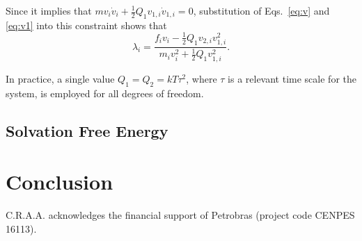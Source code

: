 \documentclass[
    journal=jctcce,
    layout=twocolumn
]{achemso}
\newcommand{\dof}{i}   %
\begin{document}
Since it implies that $m v_\dof \dot{v}_\dof + \frac{1}{2} Q_1 v_{1,\dof}\dot{v}_{1,\dof} = 0$, substitution of Eqs.~\eqref{eq:v} and \eqref{eq:v1} into this constraint shows that
\begin{equation}
\lambda_\dof = \frac{f_\dof v_\dof - \frac{1}{2} Q_1 v_{2,\dof} v_{1,\dof}^2}{m_\dof v_\dof^2 + \frac{1}{2} Q_1 v_{1,\dof}^2}.
\end{equation}
        
In practice, a single value $Q_1 = Q_2 = kT\tau^2$, where $\tau$ is a relevant time scale for the system, is employed for all degrees of freedom.

\subsection{Solvation Free Energy}
\label{sec:solvation free energy}


\section{Conclusion}


\begin{acknowledgement}

C.R.A.A. acknowledges the financial support of Petrobras (project code CENPES 16113).

\end{acknowledgement}


\end{document}

